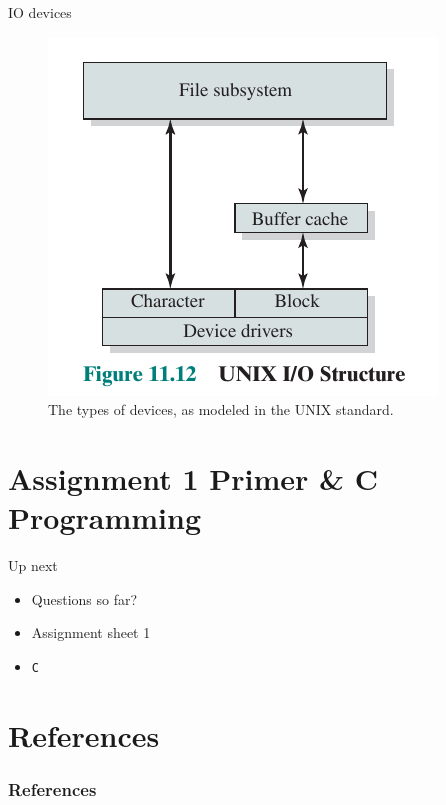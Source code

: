 \documentclass[10pt]{beamer}
\begin{document}
\begin{frame}[allowframebreaks]{IO devices}
        \begin{figure}
       \begin{center}
       \includegraphics[keepaspectratio, width=\textwidth,height=0.6\textheight-4\baselineskip]{img/211_io_types.png}
      \end{center}
      \caption{The types of devices, as modeled in the UNIX standard.~\autocite{stallings}}
      \end{figure}
\end{frame}


\section{Assignment 1 Primer \&  C Programming }
\begin{frame}{Up next}
    \begin{itemize}
        \item Questions so far? \\
        \item Assignment sheet 1 \\
        \item \texttt{C} 
    \end{itemize}
    \end{frame}
    
\section{References}
    \begin{frame}[allowframebreaks]
      \frametitle{References}
      \begin{tiny}
      \nocite{*}
      \printbibliography
      \end{tiny}
    \end{frame}
\end{document}
